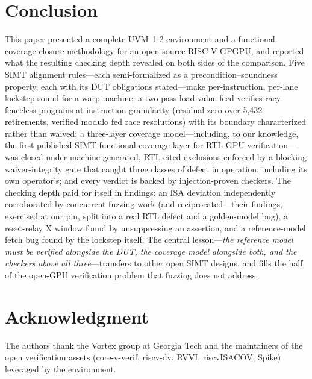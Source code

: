 \documentclass[review,12pt]{elsarticle}
\begin{document}
\section{Conclusion}
This paper presented a complete UVM~1.2 environment and a
functional-coverage closure methodology for an open-source RISC-V
GPGPU, and reported what the resulting checking depth revealed on
both sides of the comparison. Five SIMT alignment rules---each
semi-formalized as a precondition--soundness property, each with its
DUT obligations stated---make per-instruction, per-lane lockstep
sound for a warp machine; a two-pass load-value feed verifies racy
fenceless programs at instruction granularity (residual zero over
5{,}432 retirements, verified modulo fed race resolutions) with its
boundary characterized rather than waived; a three-layer coverage
model---including, to our knowledge, the first published SIMT
functional-coverage layer for RTL GPU verification---was closed
under machine-generated, RTL-cited exclusions enforced by a blocking
waiver-integrity gate that caught three classes of defect in
operation, including its own operator's; and every verdict is backed
by injection-proven checkers. The checking depth paid for itself in
findings: an ISA deviation independently corroborated by concurrent
fuzzing work (and reciprocated---their findings, exercised at our
pin, split into a real RTL defect and a golden-model bug), a
reset-relay X window found by unsuppressing an assertion, and a
reference-model fetch bug found by the lockstep itself. The
central lesson---\emph{the reference model must be verified
	alongside the DUT, the coverage model alongside both, and the
	checkers above all three}---transfers to other open SIMT designs,
and fills the half of the open-GPU verification problem that fuzzing
does not address.

\section*{Acknowledgment}
The authors thank the Vortex group at Georgia Tech and the
maintainers of the open verification assets (core-v-verif, riscv-dv,
RVVI, riscvISACOV, Spike) leveraged by the environment.
\end{document}
